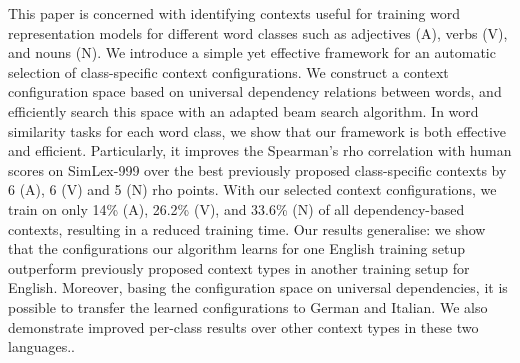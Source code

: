 This paper is concerned with identifying contexts useful for training word representation models for different word classes such as adjectives (A), verbs (V), and nouns (N). We introduce a simple yet effective framework for an automatic selection of class-specific context configurations. We construct a context configuration space based on universal dependency relations between words, and efficiently search this space with an adapted beam search algorithm. In word similarity tasks for each word class, we show that our framework is both effective and efficient. Particularly, it improves the Spearman's rho correlation with human scores on SimLex-999 over the best previously proposed class-specific contexts by 6 (A), 6 (V) and 5 (N) rho points. With our selected context configurations, we train on only 14\% (A), 26.2\% (V), and 33.6\% (N) of all dependency-based contexts, resulting in a reduced training time. Our results generalise: we show that the configurations our algorithm learns for one English training setup outperform previously proposed context types in another training setup for English. Moreover, basing the configuration space on universal dependencies, it is possible to transfer the learned configurations to German and Italian. We also demonstrate improved per-class results over other context types in these two languages..
